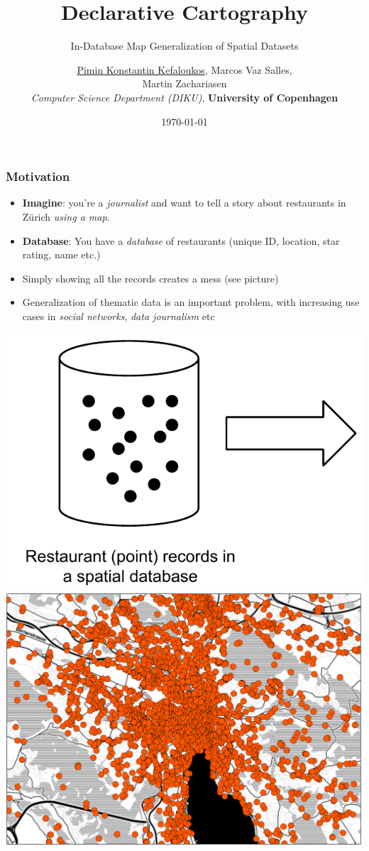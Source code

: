 \documentclass{beamer}
\title{Declarative Cartography}
\subtitle{In-Database Map Generalization of Spatial Datasets}
\author{\underline{Pimin Konstantin Kefaloukos}, Marcos Vaz Salles, \\Martin Zachariasen\\ \small{\emph{Computer Science Department (DIKU)}, \textbf{University of Copenhagen}}}
\date{\today}
\begin{document}
\frame{\titlepage}

\frame
{
  \frametitle{Motivation}
  \begin{itemize}
  \item \textbf{Imagine}: you're a \emph{journalist} and want to tell a story about restaurants in Z\"{u}rich \emph{using a map}.
  \item \textbf{Database}: You have a \emph{database} of restaurants (unique ID, location, star rating, name etc.)
  \item Simply showing all the records creates a mess (see picture)
  \item Generalization of thematic data is an important problem, with increasing use cases in \emph{social networks}, \emph{data journalism} etc
  \end{itemize}
  \includegraphics[scale=0.5]{figs/spatial-database-with-points.pdf} \includegraphics[scale=0.18]{figs/zurich-unfiltered.pdf}
}
\end{document}

